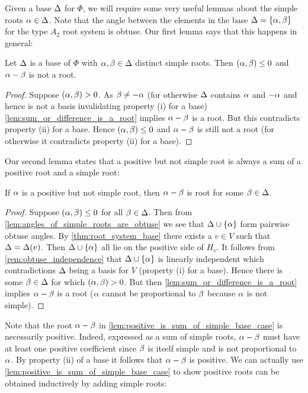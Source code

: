 \documentclass[12pt,reqno,oneside]{amsart}
\begin{document}
    Given a base $\Delta$ for $\Phi$, we will require some very useful lemmas about the simple roots $\alpha \in \Delta$. Note that the angle between the elements in the base $\Delta = \{\alpha,\beta\}$ for the type $A_{2}$ root system is obtuse. Our first lemma says that this happens in general:

    \begin{lemma}\label{lem:angles_of_simple_roots_are_obtuse}
        Let $\Delta$ is a base of $\Phi$ with $\alpha,\beta \in \Delta$ distinct simple roots. Then $(\alpha,\beta) \le 0$ and $\alpha-\beta$ is not a root.
    \end{lemma}
    \begin{proof}
        Suppose $(\alpha,\beta) > 0$. As $\beta \neq -\alpha$ (for otherwise $\Delta$ contains $\alpha$ and $-\alpha$ and hence is not a basis invalidating property (i) for a base) \cref{lem:sum_or_difference_is_a_root} implies $\alpha-\beta$ is a root. But this contradicts property (ii) for a base. Hence $(\alpha,\beta) \le 0$ and $\alpha-\beta$ is still not a root (for otherwise it contradicts property (ii) for a base).
    \end{proof}

    Our second lemma states that a positive but not simple root is always a sum of a positive root and a simple root:

    \begin{lemma}\label{lem:positive_is_sum_of_simple_base_case}
        If $\alpha$ is a positive but not simple root, then $\alpha-\beta$ is root for some $\beta \in \Delta$.
    \end{lemma}
    \begin{proof}
        Suppose $(\alpha,\beta) \le 0$ for all $\beta \in \Delta$. Then from \cref{lem:angles_of_simple_roots_are_obtuse} we see that $\Delta \cup \{\alpha\}$ form pairwise obtuse angles. By \cref{thm:root_system_base} there exists a $v \in V$ such that $\Delta = \Delta(v)$. Then $\Delta \cup \{\alpha\}$ all lie on the positive side of $H_{v}$. It follows from \cref{rem:obtuse_independence} that $\Delta \cup \{\alpha\}$ is linearly independent which contradictions $\Delta$ being a basis for $V$ (property (i) for a base). Hence there is some $\beta \in \Delta$ for which $(\alpha,\beta) > 0$. But then \cref{lem:sum_or_difference_is_a_root} implies $\alpha-\beta$ is a root ($\alpha$ cannot be proportional to $\beta$ because $\alpha$ is not simple).
    \end{proof}

    Note that the root $\alpha-\beta$ in \cref{lem:positive_is_sum_of_simple_base_case} is necessarily positive. Indeed, expressed as a sum of simple roots, $\alpha-\beta$ must have at least one positive coefficient since $\beta$ is itself simple and is not proportional to $\alpha$. By property (ii) of a base it follows that $\alpha-\beta$ is positive. We can actually use \cref{lem:positive_is_sum_of_simple_base_case} to show positive roots can be obtained inductively by adding simple roots:
\end{document}
